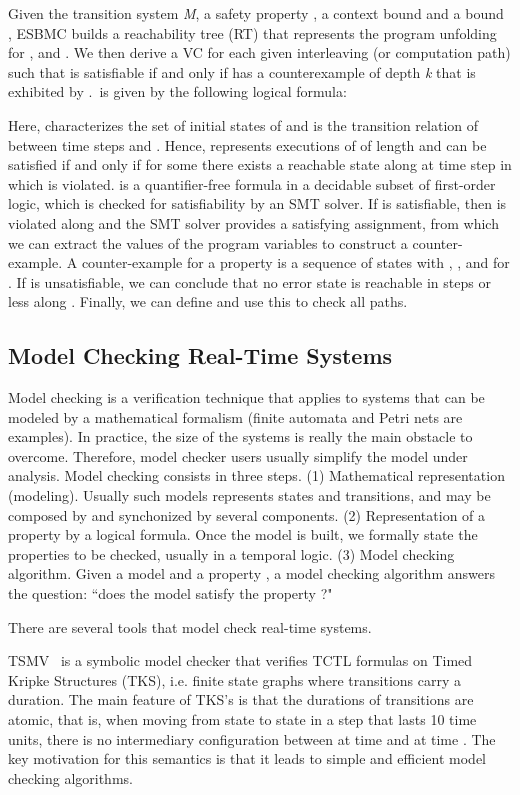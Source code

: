 \documentclass{llncs}
\begin{document}
Given the transition system \textit{M}, a safety property , a context bound  and a bound , 
ESBMC builds a reachability tree (RT) that represents the program unfolding for ,  and . 
We then derive a VC  for each given interleaving (or computation path)  such that  
is satisfiable if and only if  has a counterexample of depth \textit{k} that is exhibited by .\  is given by 
the following logical formula:



Here,  characterizes the set of initial states of  and  is the transition relation of  
between time steps  and . Hence,  represents 
executions of  of length  and  can be satisfied if and only if for some  there exists 
a reachable state along  at time step  in which  is violated.  is a quantifier-free 
formula in a decidable subset of first-order logic, which is checked for satisfiability by an SMT solver. 
If  is satisfiable, then  is violated along  and the SMT solver provides a satisfying assignment, 
from which we can extract the values of the program variables to construct a counter-example. 
A counter-example for a property  is a sequence of states  
with , , and  for . 
If  is unsatisfiable, we can conclude that no error state is reachable in  steps or less along . 
Finally, we can define  and use this to check all paths. 


\subsection{Model Checking Real-Time Systems}

Model checking is a verification technique that applies to systems that can be modeled by a mathematical 
formalism (finite automata and Petri nets are examples). 
In practice, the size of the systems is really the main obstacle to overcome.
Therefore, model checker users usually simplify the model under analysis.
Model checking consists in three steps.
(1) Mathematical representation (modeling). 
Usually such models represents states and transitions, and may be composed by and synchonized by several components. 
(2) Representation of a property by a logical formula. 
Once the model is built, we formally state the properties to be checked, usually in a temporal logic.
(3) Model checking algorithm. 
Given a model  and a property , a model checking algorithm answers the question: 
``does the model  satisfy the property ?"

There are several tools that model check real-time systems.

TSMV~\cite{Markey03} is a symbolic model checker that verifies TCTL formulas on Timed Kripke Structures (TKS), 
i.e. finite state graphs where transitions carry a duration. 
The main feature of TKS's is that the durations of transitions are atomic, that is, 
when moving from state  to state  in a step that lasts 10 time units, 
there is no intermediary configuration between  at time  and  at time . 
The key motivation for this semantics is that it leads to simple and efficient model checking algorithms.
\end{document}
